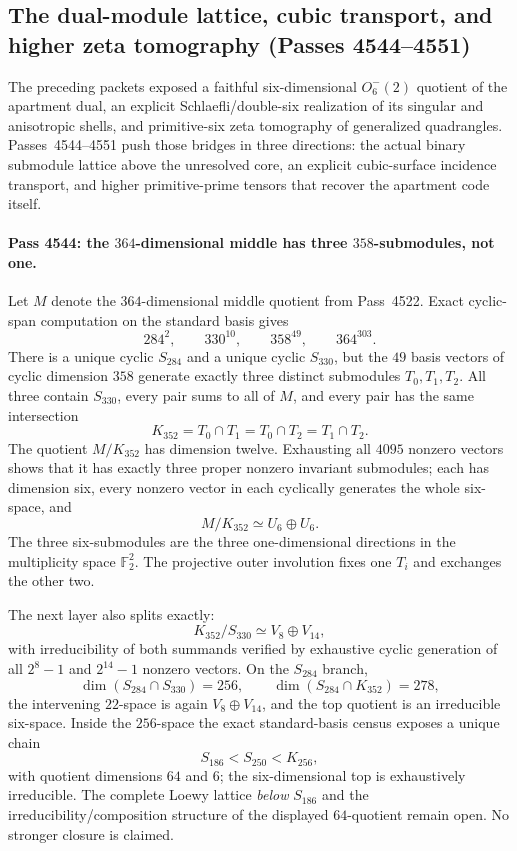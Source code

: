\subsection{The dual-module lattice, cubic transport, and higher zeta tomography (Passes 4544--4551)}
\label{sec:pass4544-4551-module-cubic-zeta}

The preceding packets exposed a faithful six-dimensional $O^-_6(2)$ quotient of
the apartment dual, an explicit Schlaefli/double-six realization of its singular
and anisotropic shells, and primitive-six zeta tomography of generalized
quadrangles.  Passes~4544--4551 push those bridges in three directions: the
actual binary submodule lattice above the unresolved core, an explicit
cubic-surface incidence transport, and higher primitive-prime tensors that
recover the apartment code itself.

\paragraph{Pass 4544: the $364$-dimensional middle has three $358$-submodules, not one.}
Let $M$ denote the $364$-dimensional middle quotient from Pass~4522.  Exact
cyclic-span computation on the standard basis gives
\[
  284^2,\qquad330^{10},\qquad358^{49},\qquad364^{303}.
\]
There is a unique cyclic $S_{284}$ and a unique cyclic $S_{330}$, but the
$49$ basis vectors of cyclic dimension $358$ generate exactly three distinct
submodules $T_0,T_1,T_2$.  All three contain $S_{330}$, every pair sums to all
of $M$, and every pair has the same intersection
\[
  \boxed{K_{352}=T_0\cap T_1=T_0\cap T_2=T_1\cap T_2.}
\]
The quotient $M/K_{352}$ has dimension twelve.  Exhausting all $4095$ nonzero
vectors shows that it has exactly three proper nonzero invariant submodules;
each has dimension six, every nonzero vector in each cyclically generates the
whole six-space, and
\[
  \boxed{M/K_{352}\simeq U_6\oplus U_6.}
\]
The three six-submodules are the three one-dimensional directions in the
multiplicity space $\mathbb F_2^2$.  The projective outer involution fixes one
$T_i$ and exchanges the other two.

The next layer also splits exactly:
\[
  \boxed{K_{352}/S_{330}\simeq V_8\oplus V_{14},}
\]
with irreducibility of both summands verified by exhaustive cyclic generation
of all $2^8-1$ and $2^{14}-1$ nonzero vectors.  On the $S_{284}$ branch,
\[
 \dim(S_{284}\cap S_{330})=256,\qquad
 \dim(S_{284}\cap K_{352})=278,
\]
the intervening $22$-space is again $V_8\oplus V_{14}$, and the top quotient is
an irreducible six-space.  Inside the $256$-space the exact standard-basis
census exposes a unique chain
\[
  S_{186}<S_{250}<K_{256},
\]
with quotient dimensions $64$ and $6$; the six-dimensional top is exhaustively
irreducible.  The complete Loewy lattice \emph{below} $S_{186}$ and the
irreducibility/composition structure of the displayed $64$-quotient remain
open.  No stronger closure is claimed.

